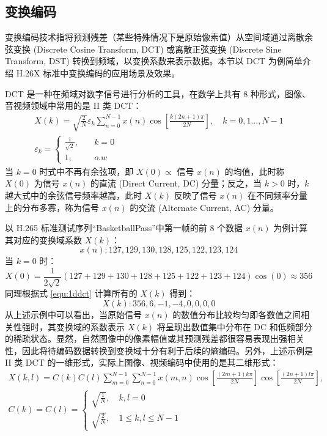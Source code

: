 \subsection{变换编码}
\label{cha:TransformOverview}
变换编码技术指将预测残差（某些特殊情况下是原始像素值）从空间域通过离散余弦变换 (Discrete Cosine Transform, DCT) 或离散正弦变换 (Discrete Sine Transform, DST) 转换到频域，以变换系数来表示数据。本节以 DCT 为例简单介绍 H.26X 标准中变换编码的应用场景及效果。

DCT 是一种在频域对数字信号进行分析的工具，在数学上共有 8 种形式，图像、音视频领域中常用的是 II 类 DCT：
\begin{equation}
    \begin{gathered}
        X(k) = \sqrt{\frac{2}{N}}\varepsilon_{k}\sum_{n=0}^{N-1}x(n)\cos\left[\frac{k(2n+1)\pi}{2N}\right], \quad k=0,1...,N-1 \\
        \varepsilon_{k}= \left\{
        \begin{aligned}
            \frac{1}{\sqrt{2}}, \quad & k=0 \\
            1, \quad                  & o.w
        \end{aligned} \right.
    \end{gathered}
    \label{equ:1ddct}
\end{equation}
当 $k=0$ 时式中不再有余弦项，即 $X(0)\propto$ 信号 $x(n)$ 的均值，此时称 $X(0)$ 为信号 $x(n)$ 的直流 (Direct Current, DC) 分量；反之，当 $k>0$ 时，$k$ 越大式中的余弦信号频率越高，此时 $X(k)$ 反映了信号 $x(n)$ 在不同频率分量上的分布多寡，称为信号 $x(n)$ 的交流 (Alternate Current, AC) 分量。

以 H.265 标准测试序列“BasketballPass”中第一帧的前 8 个数据 $x(n)$ 为例计算其对应的变换域系数 $X(k)$：
\[
    x(n): 127,129,130,128,125,122,123,124
\]
当 $k=0$ 时：
\[
    X(0)=\frac{1}{2\sqrt{2}}(127+129+130+128+125+122+123+124)\cos(0)\approx 356
\]
同理根据式 \ref{equ:1ddct} 计算所有的 $X(k)$ 得到：
\[
    X(k): 356,6,-1,-4,0,0,0,0
\]
从上述示例中可以看出，当原始信号 $x(n)$ 的数值分布比较均匀即各数值之间相关性强时，其变换域的系数表示 $X(k)$ 将呈现出数值集中分布在 DC 和低频部分的稀疏状态。显然，自然图像中的像素幅值或其预测残差都很容易表现出强相关性，因此将待编码数据转换到变换域十分有利于后续的熵编码。另外，上述示例是 II 类 DCT 的一维形式，实际上图像、视频编码中使用的是其二维形式：
\begin{equation}
    \begin{gathered}
        X(k,l)=C(k)C(l)\sum_{m=0}^{N-1}\sum_{n=0}^{N-1}x(m,n)\cos\left[\frac{(2m+1)k\pi}{2N}\right]\cos\left[\frac{(2n+1)l\pi}{2N}\right], \\
        C(k)=C(l)=
        \begin{cases}
            \sqrt{\frac{1}{N}}, \quad k,l=0 \\
            \sqrt{\frac{2}{N}}, \quad 1 \leqslant k,l \leqslant N-1
        \end{cases}
    \end{gathered}
    \label{equ:2ddct}
\end{equation}

